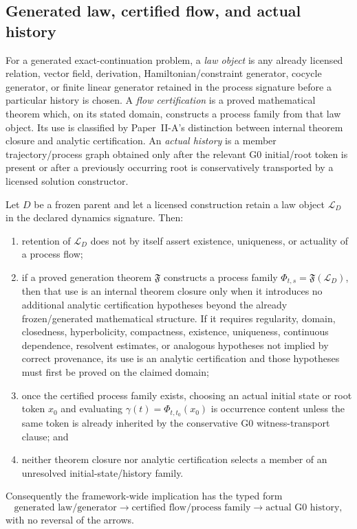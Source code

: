 \documentclass[12pt,a4paper]{article}
\begin{document}
\subsection{Generated law, certified flow, and actual history}
\begin{definition}
\label{p3a:def:v149-law-flow-history}
For a generated exact-continuation problem, a \emph{law object} is any
already licensed relation, vector field, derivation, Hamiltonian/constraint
generator, cocycle generator, or finite linear generator retained in the
process signature before a particular history is chosen.  A \emph{flow
certification} is a proved mathematical theorem which, on its stated domain,
constructs a process family from that law object.  Its use is classified by
Paper~II-A's distinction between internal theorem closure and analytic
certification.  An \emph{actual history} is a member trajectory/process graph
obtained only after the relevant G0 initial/root token is present or after a
previously occurring root is conservatively transported by a licensed
solution constructor.
\end{definition}

\begin{theorem}
\label{p3a:thm:v149-law-flow-history-separation}
Let \(D\) be a frozen parent and let a licensed construction retain a law
object \(\mathscr L_D\) in the declared dynamics signature.  Then:
\begin{enumerate}[label=(\roman*),leftmargin=2em]
\item retention of \(\mathscr L_D\) does not by itself assert existence,
      uniqueness, or actuality of a process flow;
\item if a proved generation theorem \(\mathfrak F\) constructs a process
      family \(\Phi_{t,s}=\mathfrak F(\mathscr L_D)\), then that use is an
      internal theorem closure only when it introduces no additional analytic
      certification hypotheses beyond the already frozen/generated
      mathematical structure.  If it requires regularity, domain, closedness,
      hyperbolicity, compactness, existence, uniqueness, continuous
      dependence, resolvent estimates, or analogous hypotheses not implied by
      correct provenance, its use is an analytic certification and those
      hypotheses must first be proved on the claimed domain;
\item once the certified process family exists, choosing an actual initial
      state or root token \(x_0\) and evaluating
      \(\gamma(t)=\Phi_{t,t_0}(x_0)\) is occurrence content unless the same
      token is already inherited by the conservative G0 witness-transport
      clause; and
\item neither theorem closure nor analytic certification selects a member of
      an unresolved initial-state/history family.
\end{enumerate}
Consequently the framework-wide implication has the typed form
\[
 \boxed{
 \text{generated law/generator}
 \longrightarrow
 \text{certified flow/process family}
 \longrightarrow
 \text{actual G0 history},}
\]
with no reversal of the arrows.
\end{theorem}
\end{document}
